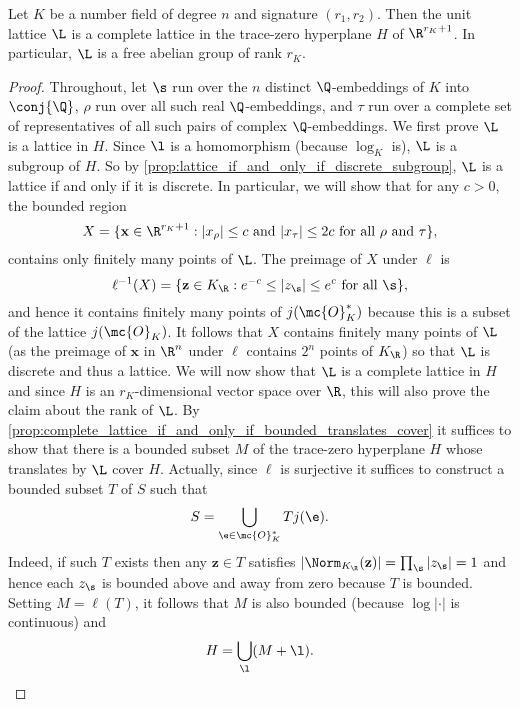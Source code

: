       \begin{theorem}\label{thm:unit_group_complete_lattice}
        Let $K$ be a number field of degree $n$ and signature $(r_{1},r_{2})$. Then the unit lattice $\L$ is a complete lattice in the trace-zero hyperplane $H$ of $\R^{r_{K}+1}$. In particular, $\L$ is a free abelian group of rank $r_{K}$.
      \end{theorem}
      \begin{proof}
        Throughout, let $\s$ run over the $n$ distinct $\Q$-embeddings of $K$ into $\conj{\Q}$, $\rho$ run over all such real $\Q$-embeddings, and $\tau$ run over a complete set of representatives of all such pairs of complex $\Q$-embeddings. We first prove $\L$ is a lattice in $H$. Since $\l$ is a homomorphism (because $\log_{K}$ is), $\L$ is a subgroup of $H$. So by \cref{prop:lattice_if_and_only_if_discrete_subgroup}, $\L$ is a lattice if and only if it is discrete. In particular, we will show that for any $c > 0$, the bounded region
        \[
          X = \{\mathbf{x} \in \R^{r_{K}+1}:\text{$|x_{\rho}| \le c$ and $|x_{\tau}| \le 2c$ for all $\rho$ and $\tau$}\},
        \]
        contains only finitely many points of $\L$. The preimage of $X$ under $\ell$ is
        \[
          \ell^{-1}(X) = \{\mathbf{z} \in K_{\R}:\text{$e^{-c} \le |z_{\s}| \le e^{c}$ for all $\s$}\},
        \]
        and hence it contains finitely many points of $j(\mc{O}_{K}^{\ast})$ because this is a subset of the lattice $j(\mc{O}_{K})$. It follows that $X$ contains finitely many points of $\L$ (as the preimage of $\mathbf{x}$ in $\R^{n}$ under $\ell$ contains $2^{n}$ points of $K_{\R}$) so that $\L$ is discrete and thus a lattice. We will now show that $\L$ is a complete lattice in $H$ and since $H$ is an $r_{K}$-dimensional vector space over $\R$, this will also prove the claim about the rank of $\L$. By \cref{prop:complete_lattice_if_and_only_if_bounded_translates_cover} it suffices to show that there is a bounded subset $M$ of the trace-zero hyperplane $H$ whose translates by $\L$ cover $H$. Actually, since $\ell$ is surjective it suffices to construct a bounded subset $T$ of $S$ such that
        \[
          S = \bigcup_{\e \in \mc{O}_{K}^{\ast}}Tj(\e).
        \]
        Indeed, if such $T$ exists then any $\mathbf{z} \in T$ satisfies $|\Norm_{K_{\R}}(\mathbf{z})| = \prod_{\s}|z_{\s}| = 1$ and hence each $z_{\s}$ is bounded above and away from zero because $T$ is bounded. Setting $M = \ell(T)$, it follows that $M$ is also bounded (because $\log|\cdot|$ is continuous) and
        \[
          H = \bigcup_{\l}(M+\l).
\]
\end{proof}

